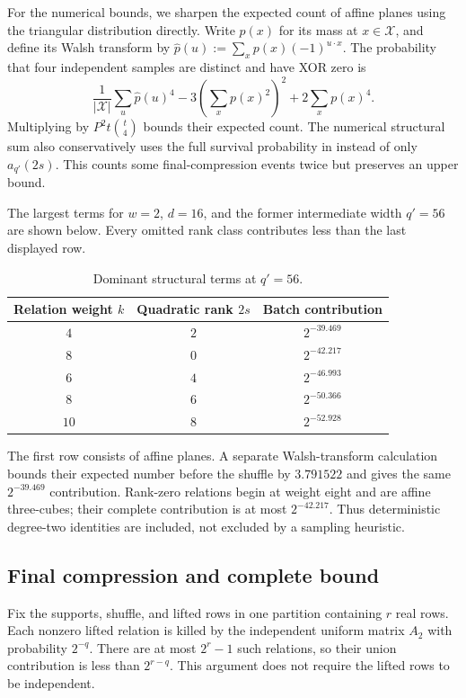 For the numerical bounds, we sharpen the expected count of affine planes
using the triangular distribution directly.  Write $p(x)$ for its mass at
$x\in\mathcal X$, and define its Walsh transform by
$\widehat p(u):=\sum_x p(x)(-1)^{u\cdot x}$.  The probability that four
independent samples are distinct and have XOR zero is
\[
 \frac{1}{|\mathcal X|}\sum_u\widehat p(u)^4
 -3\left(\sum_x p(x)^2\right)^2+2\sum_x p(x)^4.
\]
Multiplying by $P^2t\binom t4$ bounds their expected count.  The numerical
structural sum also conservatively uses the full survival probability in
 instead of only $a_{q'}(2s)$.
This counts some final-compression events twice but preserves an upper bound.

The largest terms for $w=2$, $d=16$, and the former intermediate width
$q'=56$ are shown below.  Every omitted rank class contributes less than the
last displayed row.
\begin{table}[H]
\centering
\caption{Dominant structural terms at $q'=56$.}
\label{tab:rc-hash-structural-terms}
\begin{tabular}{c@{\qquad}c@{\qquad}c}
\toprule
Relation weight $k$ & Quadratic rank $2s$ & Batch contribution \\
\midrule
$4$  & $2$ & $2^{-39.469}$ \\
$8$  & $0$ & $2^{-42.217}$ \\
$6$  & $4$ & $2^{-46.993}$ \\
$8$  & $6$ & $2^{-50.366}$ \\
$10$ & $8$ & $2^{-52.928}$ \\
\bottomrule
\end{tabular}
\end{table}
The first row consists of affine planes.  A separate Walsh-transform
calculation bounds their expected number before the shuffle by $3.791522$ and
gives the same $2^{-39.469}$ contribution.  Rank-zero relations begin at
weight eight and are affine three-cubes; their complete contribution is at
most $2^{-42.217}$.  Thus deterministic degree-two identities are included,
not excluded by a sampling heuristic.

\subsection{Final compression and complete bound}

Fix the supports, shuffle, and lifted rows in one partition containing $r$
real rows.  Each nonzero lifted relation is killed by the independent uniform
matrix $A_2$ with probability $2^{-q}$.  There are at most $2^r-1$ such
relations, so their union contribution is less than $2^{r-q}$.  This argument
does not require the lifted rows to be independent.


